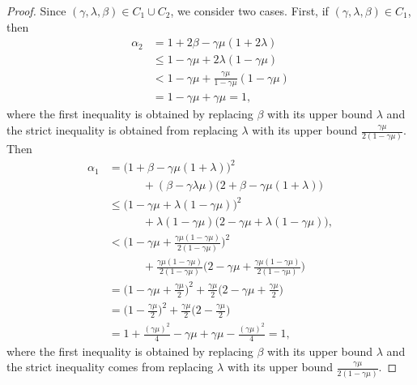 \documentclass[9pt,shortpaper,twoside,web]{ieeecolor}
\begin{document}
    \begin{proof}
        Since $(\gamma,\lambda,\beta)\in C_1\cup C_2$, we consider two cases.
    First, if $(\gamma,\lambda,\beta)\in C_1$, then
    \begin{align}
        \alpha_2 &= 1 + 2\beta - \gamma\mu(1+2\lambda)
        \\ &\leq 1 - \gamma\mu + 2\lambda(1-\gamma\mu)
        \\ &< 1 - \gamma\mu + \frac{\gamma\mu}{1-\gamma\mu}(1-\gamma\mu)
        \\ &= 1 -\gamma\mu + \gamma\mu =1,
    \end{align}
    where the first inequality is obtained by replacing $\beta$ with its upper bound $\lambda$ and the strict inequality is obtained from replacing $\lambda$ with its upper bound $\frac{\gamma\mu}{2(1-\gamma\mu)}$.
    Then
    \begin{align}
        \alpha_1 &= \big(1+\beta-\gamma\mu(1+\lambda)\big)^2
        \\ &\quad\quad\quad+(\beta-\gamma\lambda\mu)\big(2+\beta-\gamma\mu(1+\lambda)\big)
        \\&\leq \big(1 -\gamma\mu+\lambda(1-\gamma\mu)\big)^2
        \\ &\quad\quad\quad + \lambda(1-\gamma\mu)\big(2-\gamma\mu + \lambda(1-\gamma\mu)\big),
        \\ &<\Big(1-\gamma\mu + \frac{\gamma\mu(1-\gamma\mu)}{2(1-\gamma\mu)}\Big)^2
        \\ &\quad\quad\quad + \frac{\gamma\mu(1-\gamma\mu)}{2(1-\gamma\mu)}\Big(2 - \gamma\mu + \frac{\gamma\mu(1-\gamma\mu)}{2(1-\gamma\mu)}\Big)
        \\ &= \big(1-\gamma\mu + \frac{\gamma\mu}{2}\big)^2 + \frac{\gamma\mu}{2}\big(2-\gamma\mu +\frac{\gamma\mu}{2}\big)
        \\ &= \big(1-\frac{\gamma\mu}{2}\big)^2+ \frac{\gamma\mu}{2}\big(2-\frac{\gamma\mu}{2}\big)
        \\ &= 1 + \frac{(\gamma\mu)^2}{4}- \gamma\mu + \gamma\mu - \frac{(\gamma\mu)^2}{4} = 1,
    \end{align}
    where the first inequality is obtained by replacing $\beta$ with its upper bound $\lambda$ and the strict inequality comes from replacing $\lambda$ with its upper bound $\frac{\gamma\mu}{2(1-\gamma\mu)}$.
        

\end{proof}
\end{document}
